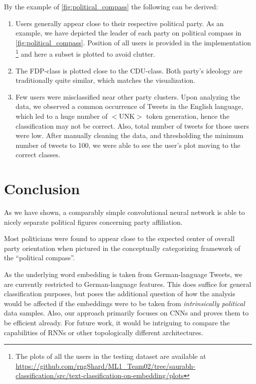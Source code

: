 \documentclass[10pt, oneside]{article}
\begin{document}
\begin{multicols}{2}

By the example of \autoref{fig:political_compass} the following can be derived:

\begin{enumerate}
	\item Users generally appear close to their respective political party. As an example, we have depicted the leader of each party on political compass in \autoref{fig:political_compass}. Position of all users is provided in the implementation \footnote{ The plots of all the users in the testing dataset are available at \url{https://github.com/rngShard/ML1_Team02/tree/saurabh-classification/src/text-classification-on-embedding/plots}  } and here a subset is plotted to avoid clutter.
	\item The FDP-class is plotted close to the CDU-class. Both party's ideology are traditionally quite similar, which matches the visualization.
	\item Few users were misclassified near other party clusters. Upon analyzing the data, we observed a common occurrence  of Tweets in the English language, which led to a huge number of $<$UNK$>$ token generation, hence the classification may not be correct. Also, total number of tweets for those users were low. After manually cleaning the data, and thresholding the minimum number of tweets to 100, we were able to see the user's plot moving to the correct classes.
\end{enumerate}

\section{Conclusion}

As we have shown, a comparably simple convolutional neural network is able to nicely separate political figures concerning party affiliation.

Most politicians were found to appear close to the expected center of overall party orientation when pictured in the conceptually categorizing framework of the ``political compass''.

As the underlying word embedding is taken from German-language Tweets, we are currently restricted to German-language features. This does suffice for general classification purposes, but poses the additional question of how the analysis would be affected if the embeddings were to be taken from \emph{intrinsically political} data samples. 
Also, our approach primarily focuses on CNNs and proves them to be efficient already. For future work, it would be intriguing to compare the capabilities of RNNs or other topologically different architectures. 

\end{multicols}

\newpage



\end{document}
